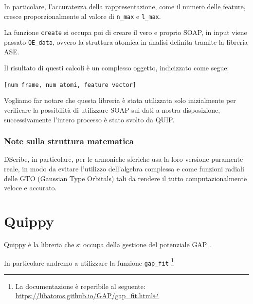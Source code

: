 \documentclass[a4paper,11pt,openany]{book}
\begin{document}
In particolare, l'accuratezza della rappresentazione, come il numero delle feature, cresce proporzionalmente al valore di \texttt{n\_max} e \texttt{l\_max}.

La funzione \texttt{create} si occupa poi di creare il vero e proprio SOAP, in input viene passato \texttt{QE\_data}, ovvero la struttura atomica in analisi definita tramite la libreria ASE.

Il risultato di questi calcoli è un complesso oggetto, indicizzato come segue:

{\centering \verb|[num frame, num atomi, feature vector]|}

Vogliamo far notare che questa libreria è stata utilizzata solo inizialmente per verificare la possibilità di utilizzare SOAP sui dati a nostra disposizione, successivamente l'intero processo è stato svolto da QUIP.


\subsubsection{Note sulla struttura matematica} 

DScribe, in particolare, per le armoniche sferiche usa la loro versione puramente reale, in modo da evitare l'utilizzo dell'algebra complessa e come funzioni radiali delle GTO (Gaussian Type Orbitals) tali da rendere il tutto computazionalmente veloce e accurato.


\section{Quippy} %
\label{sec:quippy}

Quippy è la libreria che si occupa della gestione del potenziale GAP \cite{quip-doc, quip-gap-doc}.

In particolare andremo a utilizzare la funzione \texttt{gap\_fit} 
\footnote{La documentazione è reperibile al seguente: \url{https://libatoms.github.io/GAP/gap_fit.html} }
\end{document}
